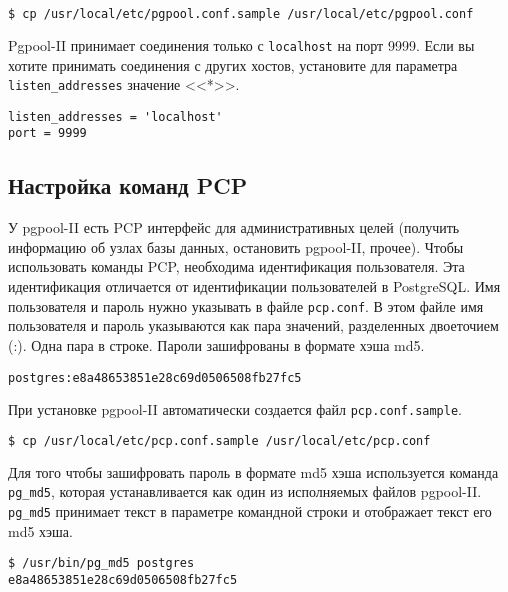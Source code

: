 \begin{lstlisting}[language=Bash,label=lst:pgpool4,caption=Файлы конфигурации]
$ cp /usr/local/etc/pgpool.conf.sample /usr/local/etc/pgpool.conf
\end{lstlisting}

Pgpool-II принимает соединения только с \lstinline!localhost! на порт 9999. Если вы хотите принимать соединения с других хостов, установите для параметра \lstinline!listen_addresses! значение <<*>>.

\begin{lstlisting}[label=lst:pgpool5,caption=Файлы конфигурации]
listen_addresses = 'localhost'
port = 9999
\end{lstlisting}


\subsection{Настройка команд PCP}

У pgpool-II есть PCP интерфейс для административных целей (получить информацию об узлах базы данных, остановить pgpool-II, прочее). Чтобы использовать команды PCP, необходима идентификация пользователя. Эта идентификация отличается от идентификации пользователей в PostgreSQL. Имя пользователя и пароль нужно указывать в файле \lstinline!pcp.conf!. В этом файле имя пользователя и пароль указываются как пара значений, разделенных двоеточием (:). Одна пара в строке. Пароли зашифрованы в формате хэша md5.

\begin{lstlisting}[label=lst:pgpool6,caption=Настройка команд PCP]
postgres:e8a48653851e28c69d0506508fb27fc5
\end{lstlisting}

При установке pgpool-II автоматически создается файл \lstinline!pcp.conf.sample!.

\begin{lstlisting}[language=Bash,label=lst:pgpool7,caption=Настройка команд PCP]
$ cp /usr/local/etc/pcp.conf.sample /usr/local/etc/pcp.conf
\end{lstlisting}

Для того чтобы зашифровать пароль в формате md5 хэша используется команда \lstinline!pg_md5!, которая устанавливается как один из исполняемых файлов pgpool-II. \lstinline!pg_md5! принимает текст в параметре командной строки и отображает текст его md5 хэша.

\begin{lstlisting}[label=lst:pgpool8,caption=Настройка команд PCP]
$ /usr/bin/pg_md5 postgres
e8a48653851e28c69d0506508fb27fc5
\end{lstlisting}

